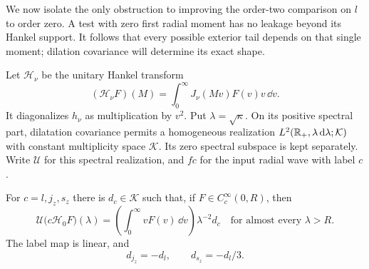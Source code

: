 We now isolate the only obstruction to improving the order-two
comparison on $l$ to order zero.  A test with zero first radial moment
has no leakage beyond its Hankel support.  It follows that every
possible exterior tail depends on that single moment; dilation
covariance will determine its exact shape.

Let $\mathcal H_\nu$ be the unitary Hankel transform
\[
 (\mathcal H_\nu F)(M)=\int_0^\infty J_\nu(Mv)F(v)v\,\dd v.
\]
It diagonalizes $h_\nu$ as multiplication by $v^2$.
Put $\lambda=\sqrt\kappa$.  On its positive spectral part,
dilatation covariance permits a homogeneous realization
$L^2(\mathbb R_+,\lambda\,\mathrm d\lambda;\mathcal K)$ with constant
multiplicity space $\mathcal K$.  Its zero spectral subspace is
kept separately.  Write $\mathcal U$ for this spectral
realization, and $f c$ for the input radial wave with label $c$.

\begin{lemma}\label{D:exact-tail}
For $c=l,j_z,s_z$ there is $d_c\in\mathcal K$ such that, if
$F\in C_c^\infty(0,R)$, then
\begin{equation}\label{D:tail}
 \mathcal U\bigl(c\mathcal H_0F\bigr)(\lambda)
 =\left(\int_0^\infty vF(v)\,\dd v\right)\lambda^{-2}d_c
 \quad\text{for almost every }\lambda>R.
\end{equation}
The label map is linear, and
\begin{equation}\label{D:tail-relations}
 d_{j_z}=-d_l,\qquad d_{s_z}=-d_l/3.
\end{equation}
\end{lemma}

